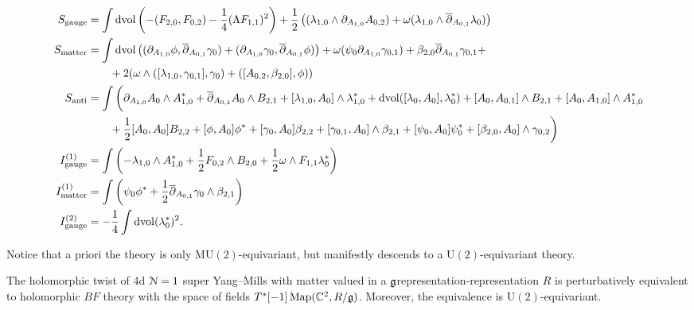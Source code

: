 \documentclass[10pt, oneside]{article}
\newcommand{\MU}{\mathrm{MU}}
\renewcommand{\U}{\mathrm{U}}
\begin{document}
\begin{align*}
S_{\mathrm{gauge}} &= \int\operatorname{dvol}\left(-(F_{2, 0}, F_{0, 2}) - \frac{1}{4}(\Lambda F_{1, 1})^2\right) + \frac 12 \left((\lambda_{1,0} \wedge \partial_{A_{1,0}} A_{0,2}) + \omega (\lambda_{1,0} \wedge \overline{\partial}_{A_{0,1}} \lambda_0) \right)  \\
S_{\mathrm{matter}} &= \int \operatorname{dvol} \left((\partial_{A_{1,0}}\phi , \overline{\partial}_{A_{0,1}} \gamma_0) + (\partial_{A_{1,0}}\gamma_0, \overline{\partial}_{A_{0,1}} \phi)\right) + \omega (\psi_0 \partial_{A_{1,0}} \gamma_{0,1}) + \beta_{2,0} \overline{\partial}_{A_{0,1}} \gamma_{0,1}  + \\
&\qquad + 2 (\omega \wedge ([\lambda_{1,0}, \gamma_{0,1}] ,\gamma_{0}) + ([A_{0,2}, \beta_{2,0}], \phi) )  \\
S_{\mathrm{anti}} &= \int \bigg(\partial_{A_{1, 0}} A_0 \wedge A_{1,0}^* + \overline{\partial}_{A_{0, 1}} A_0 \wedge B_{2, 1} + [\lambda_{1,0}, A_0]\wedge \lambda_{1,0}^* + \operatorname{dvol} ([\lambda_{0}, A_0], \lambda_{0}^*) + [A_0, A_{0,1}]\wedge B_{2, 1} + [A_{0}, A_{1,0}]\wedge A_{1, 0}^* \\
&\qquad + \frac{1}{2}[A_0, A_0]B_{2, 2} + [\phi, A_0] \phi^* + [\gamma_0, A_0] \beta_{2,2} + [\gamma_{0,1}, A_0]\wedge \beta_{2,1} + [\psi_0, A_0] \psi_0^* + [\beta_{2,0}, A_0] \wedge \gamma_{0,2} \bigg) \\
I^{(1)}_{\mathrm{gauge}} &=  \int  \left( - \lambda_{1,0}\wedge A_{1,0}^* + \frac 12 F_{0,2}\wedge B_{2,0} + \frac 12 \omega\wedge F_{1,1} \lambda_0^*  \right) \\
I^{(1)}_{\mathrm{matter}} &=  \int  \left( \psi_0 \phi^* + \frac 12 \overline{\partial}_{A_{0,1}} \gamma_{0}\wedge \beta_{2,1} \right)\\
I^{(2)}_{\mathrm{gauge}} &= -\frac{1}{4}\int \operatorname{dvol}(\lambda_0^*)^2.
\end{align*}

Notice that a priori the theory is only $\MU(2)$-equivariant, but manifestly descends to a $\U(2)$-equivariant theory. 

\begin{theorem} \label{4d_minimal_twist_thm}
The holomorphic twist of 4d $\mathcal N=1$ super Yang--Mills with matter valued in a $\mathfrak g$representation-representation $R$ is perturbatively equivalent to holomorphic $BF$ theory with the space of fields $T^*[-1]\operatorname{Map}(\mathbb C^2, R/\mathfrak g)$. Moreover, the equivalence is $\U(2)$-equivariant.
\end{theorem}
\end{document}
